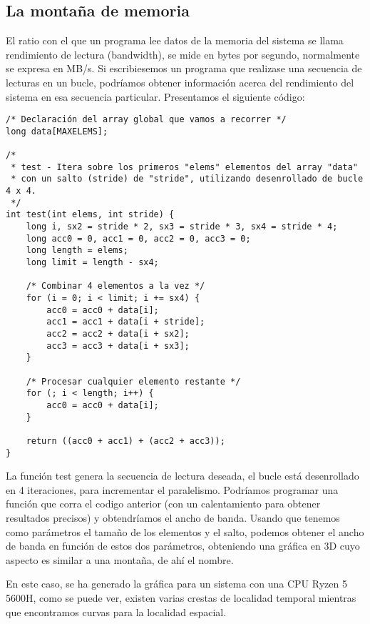 \subsection{La montaña de memoria}
El ratio con el que un programa lee datos de la memoria del sistema se llama rendimiento de lectura (bandwidth), se mide en bytes por segundo,
normalmente se expresa en MB/s. Si escribiesemos un programa que realizase una secuencia de lecturas en un bucle, podríamos obtener información 
acerca del rendimiento del sistema en esa secuencia particular. Presentamos el siguiente código:
\begin{center}
    \begin{verbatim}
/* Declaración del array global que vamos a recorrer */
long data[MAXELEMS];

/*
 * test - Itera sobre los primeros "elems" elementos del array "data"
 * con un salto (stride) de "stride", utilizando desenrollado de bucle 4 x 4.
 */
int test(int elems, int stride) {
    long i, sx2 = stride * 2, sx3 = stride * 3, sx4 = stride * 4;
    long acc0 = 0, acc1 = 0, acc2 = 0, acc3 = 0;
    long length = elems;
    long limit = length - sx4;

    /* Combinar 4 elementos a la vez */
    for (i = 0; i < limit; i += sx4) {
        acc0 = acc0 + data[i];
        acc1 = acc1 + data[i + stride];
        acc2 = acc2 + data[i + sx2];
        acc3 = acc3 + data[i + sx3];
    }

    /* Procesar cualquier elemento restante */
    for (; i < length; i++) {
        acc0 = acc0 + data[i];
    }

    return ((acc0 + acc1) + (acc2 + acc3));
}
    \end{verbatim}
\end{center}
La función test genera la secuencia de lectura deseada, el bucle está desenrollado en 4 iteraciones, para incrementar el paralelismo.
Podríamos programar una función que corra el codigo anterior (con un calentamiento para obtener resultados precisos) y obtendríamos el ancho de banda.
Usando que tenemos como parámetros el tamaño de los elementos y el salto, podemos obtener el ancho de banda en función de estos dos parámetros, obteniendo
una gráfica en 3D cuyo aspecto es similar a una montaña, de ahí el nombre.
\begin{center}
    
\end{center}
En este caso, se ha generado la gráfica para un sistema con una CPU Ryzen 5 5600H, como se puede ver, existen varias crestas de localidad temporal mientras 
que encontramos curvas para la localidad espacial.
